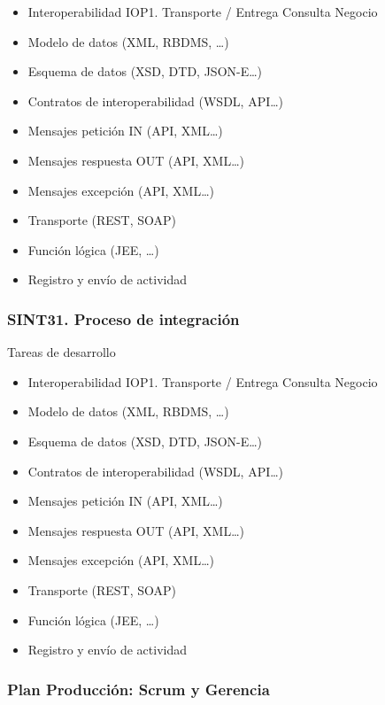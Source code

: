 \documentclass[
  paper=a4,
  ,captions=tableheading
]{scrartcl}
\providecommand{\tightlist}{%
  \setlength{\itemsep}{0pt}\setlength{\parskip}{0pt}}
\begin{document}
\begin{itemize}
\tightlist
\item
  Interoperabilidad IOP1. Transporte / Entrega Consulta Negocio\\
\item
  Modelo de datos (XML, RBDMS, \ldots)
\item
  Esquema de datos (XSD, DTD, JSON-E\ldots)
\item
  Contratos de interoperabilidad (WSDL, API\ldots)
\item
  Mensajes petición IN (API, XML\ldots)
\item
  Mensajes respuesta OUT (API, XML\ldots)
\item
  Mensajes excepción (API, XML\ldots)
\item
  Transporte (REST, SOAP)
\item
  Función lógica (JEE, \ldots)
\item
  Registro y envío de actividad
\end{itemize}

\subsubsection{SINT31. Proceso de
integración}\label{sec:sint31.-proceso-de-integraciuxf3n}

Tareas de desarrollo

\begin{itemize}
\tightlist
\item
  Interoperabilidad IOP1. Transporte / Entrega Consulta Negocio\\
\item
  Modelo de datos (XML, RBDMS, \ldots)
\item
  Esquema de datos (XSD, DTD, JSON-E\ldots)
\item
  Contratos de interoperabilidad (WSDL, API\ldots)
\item
  Mensajes petición IN (API, XML\ldots)
\item
  Mensajes respuesta OUT (API, XML\ldots)
\item
  Mensajes excepción (API, XML\ldots)
\item
  Transporte (REST, SOAP)
\item
  Función lógica (JEE, \ldots)
\item
  Registro y envío de actividad
\end{itemize}

\subsubsection{Plan Producción: Scrum y
Gerencia}\label{sec:plan-producciuxf3n-scrum-y-gerencia}
\end{document}
